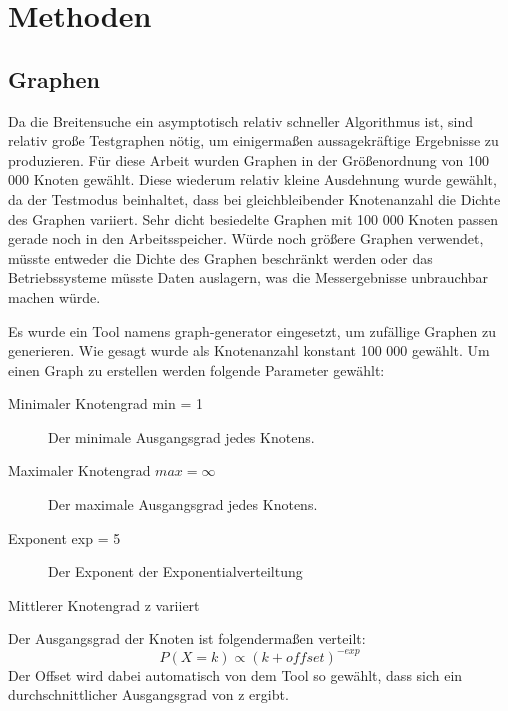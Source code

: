 
\chapter{Methoden} %
\label{cha:methoden}

\section{Graphen} %
\label{sec:graphen}
Da die Breitensuche ein asymptotisch relativ schneller Algorithmus ist, sind relativ große Testgraphen nötig, um einigermaßen aussagekräftige Ergebnisse zu produzieren. Für diese Arbeit wurden Graphen in der Größenordnung von 100 000 Knoten gewählt. Diese wiederum relativ kleine Ausdehnung wurde gewählt, da der Testmodus beinhaltet, dass bei gleichbleibender Knotenanzahl die Dichte des Graphen variiert. Sehr dicht besiedelte Graphen mit 100 000 Knoten passen gerade noch in den Arbeitsspeicher. Würde noch größere Graphen verwendet, müsste entweder die Dichte des Graphen beschränkt werden oder das Betriebssysteme müsste Daten auslagern, was die Messergebnisse unbrauchbar machen würde. 

Es wurde ein Tool namens graph-generator \cite{graph-generator:2009:Online} eingesetzt, um zufällige Graphen zu generieren. Wie gesagt wurde als Knotenanzahl konstant 100 000 gewählt. Um einen Graph zu erstellen werden folgende Parameter gewählt:
\begin{description}
	\item[Minimaler Knotengrad min = 1] Der minimale Ausgangsgrad jedes Knotens.
	\item[Maximaler Knotengrad $max = \infty$] Der maximale Ausgangsgrad jedes Knotens.
	\item[Exponent exp = 5] Der Exponent der Exponentialverteiltung
	\item[Mittlerer Knotengrad z variiert]
\end{description}
Der Ausgangsgrad der Knoten ist folgendermaßen verteilt:
$$
P(X=k) \propto (k + offset)^{-exp}
$$
Der Offset wird dabei automatisch von dem Tool so gewählt, dass sich ein durchschnittlicher Ausgangsgrad von z ergibt.

